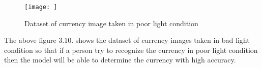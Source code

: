 \begin{figure}[h!]
	\centering
	\texttt{[image: ]}
	\caption{Dataset of currency image taken in poor light condition}
\end{figure}
\noindent The above figure 3.10. shows the dataset of currency images taken in bad light condition so that if a person try to recognize the currency in poor light condition then the model will be able to determine the currency with high accuracy.\\
